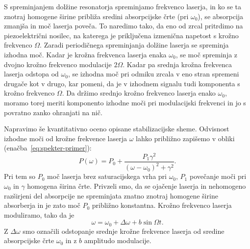 S spreminjanjem dolžine resonatorja spreminjamo frekvenco laserja, in 
ko se ta znotraj homogene širine približa sredini absorpcijske črte (pri $\omega_0$), 
se absorpcija zmanjša in moč laserja poveča. To naredimo tako, da  
eno od zrcal pritrdimo na piezoelektrični nosilec, na katerega je priključena
izmenična napetost s krožno frekvenco $\Omega$. Zaradi periodičnega spreminjanja dolžine
laserja se spreminja izhodna moč. Kadar je krožna frekvenca laserja 
enaka $\omega_0$, se moč spreminja z dvojno krožno frekvenco modulacije $2\Omega$. 
Kadar pa srednja krožna frekvenca laserja odstopa od $\omega_0$, se izhodna moč 
pri odmiku zrcala v eno stran spremeni drugače kot v drugo, kar pomeni, 
da je v izhodnem signalu tudi komponenta s krožno frekvenco $\Omega$. Da držimo 
srednjo krožno frekvenco laserja enako $\omega_0$, moramo torej meriti komponento 
izhodne moči pri modulacijski frekvenci in jo s povratno zanko ohranjati na nič.

Napravimo še kvantitativno oceno opisane stabilizacijske sheme. Odvisnost
izhodne moči od krožne frekvence laserja $\omega$ lahko približno zapišemo v
obliki (enačba~\ref{eq:spekter-primer}):
\begin{equation}  
\label{5.40}
P(\omega)=P_0 + \frac{P_1\gamma^2}{(\omega- \omega_0)^2+\gamma^2}.
\end{equation}
Pri tem so $P_0$ moč laserja brez saturacijskega vrha pri $\omega_0$, $P_1$ 
povečanje moči pri $\omega_0$ in $\gamma$ homogena širina črte. 
Privzeli  
smo, da se ojačenje laserja in nehomogeno razširjeni del absorpcije ne 
spreminjata znatno znotraj homogene širine absorberja in je zato moč $P_0$ 
približno konstantna. Krožno frekvenco laserja moduliramo, tako da je 
\begin{equation}  
\label{5.41}
\omega=\omega_0+\Delta\omega+b \sin \Omega t.
\end{equation}
Z $\Delta\omega$ smo označili odstopanje srednje krožne frekvence laserja od
sredine absorpcijske črte $\omega_0$ in z $b$ amplitudo modulacije. 

